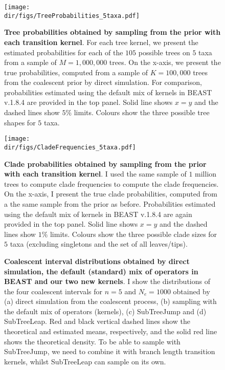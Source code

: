 \begin{figure}[!ht]
\centering
\texttt{[image: \\dir/figs/TreeProbabilities\_5taxa.pdf]}
\caption[Tree probabilities obtained by sampling from the prior with each transition kernel.]{\textbf{Tree probabilities obtained by sampling from the prior with each transition kernel}.
For each tree kernel, we present the estimated probabilities for each of the $105$ possible trees on $5$ taxa from a sample of $M = 1, 000, 000$  trees.
On the x-axis, we present the true probabilities, computed from a sample of $K = 100, 000$ trees from the coalescent prior by direct simulation.
For comparison, probabilities estimated using the default mix of kernels in BEAST v.1.8.4 are provided in the top panel.
Solid line shows $x=y$ and the dashed lines show $5\%$ limits.
Colours show the three possible tree shapes for $5$ taxa.
}
\label{fig:treeP}
\end{figure}
\begin{figure}[!ht]
\centering
\texttt{[image: \\dir/figs/CladeFrequencies\_5taxa.pdf]}
\caption[Clade probabilities obtained by sampling from the prior with each transition kernel.]{\textbf{Clade probabilities obtained by sampling from the prior with each transition kernel}.
I used the same sample of $1$ million trees to compute clade frequencies to compute the clade frequencies.
On the x-axis, I present the true clade probabilities, computed from a the same sample from the prior as before.
Probabilities estimated using the default mix of kernels in BEAST v.1.8.4 are again provided in the top panel.
Solid line shows $x=y$ and the dashed lines show $1\%$ limits.
Colours show the three possible clade sizes for $5$ taxa (excluding singletons and the set of all leaves/tips).
}
\label{fig:cladeP}
\end{figure}
\begin{figure}
\begin{center}
\end{center}
\caption[Coalescent interval distributions obtained by direct simulation, the default (standard) mix of operators in BEAST and our two new kernels.]{\textbf{Coalescent interval distributions obtained by direct simulation, the default (standard) mix of operators in BEAST and our two new kernels}.
I show the distributions of the four coalescent intervals for $n = 5$ and $N_e = 1000$  obtained by (a) direct simulation from the coalescent process, (b) sampling with the default mix of operators (kernels), (c) SubTreeJump and (d) SubTreeLeap.
Red and black vertical dashed lines show the theoretical and estimated means, respectively, and the solid red line shows the theoretical density. 
To be able to sample with SubTreeJump, we need to combine it with branch length transition kernels, whilst SubTreeLeap can sample on its own.}
\label{fig:coalIntervals}
\end{figure}
